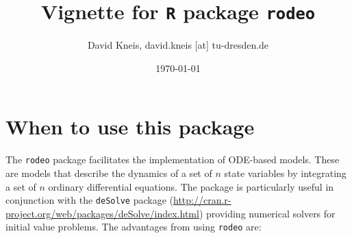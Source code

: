 \documentclass[times,onecolumn]{article}
\begin{document}



\newcommand{\software}[1]{\texttt{#1}}

\newcommand{\figdir}{.}
\newcommand{\sect}{Section}
\newcommand{\sects}{Sections}

\newcommand{\oxygen}{O\ensuremath{_{2}}}
\newcommand{\OM}{\textrm{OM}}
\newcommand{\DO}{\textrm{DO}}

\newcommand{\todo}[1]{\textcolor{red}{\textbf{#1}}}

\newcommand{\grey}[1]{\textcolor{gray}{#1}}

\title{Vignette for \software{R} package \software{rodeo}}

\author{David Kneis, david.kneis [at] tu-dresden.de}

\date{\today}

\maketitle

\tableofcontents

\section{When to use this package}

The \software{rodeo} package facilitates the implementation of ODE-based models. These are models that describe the dynamics of a set of $n$ state variables by integrating a set of $n$  ordinary differential equations. The package is particularly useful in conjunction with the \software{deSolve} package (\url{http://cran.r-project.org/web/packages/deSolve/index.html}) providing numerical solvers for initial value problems. The advantages from using \software{rodeo} are:
\end{document}
